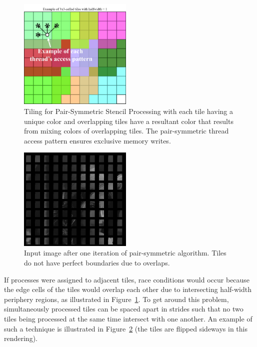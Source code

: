 \documentclass{IEEEtran}
\begin{document}
\begin{figure}
\includegraphics[width=0.48\textwidth]{images/stackedtiles}
\caption{Tiling for Pair-Symmetric Stencil Processing with each tile having a unique color and overlapping tiles have a resultant color that results from mixing colors of overlapping tiles. The pair-symmetric thread access pattern ensures exclusive memory writes.}
\label{fig:Tiling-for-Pair-Symmetric}
\end{figure}

\begin{figure}
\includegraphics[width=0.48\textwidth]{images/lenatiles}
\caption{Input image after one iteration of pair-symmetric algorithm. Tiles do not have perfect boundaries due to overlaps.}
\label{fig:An-iteration-of}
\end{figure}

If processes were assigned to adjacent tiles, race conditions would occur because the edge cells of the tiles would overlap each other due to intersecting half-width periphery regions, as illustrated in Figure~\ref{fig:Tiling-for-Pair-Symmetric}. To get around this problem, simultaneously processed tiles can be spaced apart in strides such that no two tiles being processed at the same time intersect with one another. An example of such a technique is illustrated in Figure~\ref{fig:An-iteration-of} (the tiles are flipped sideways in this rendering). 
\end{document}
